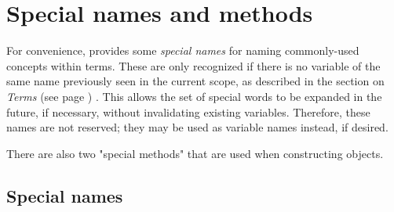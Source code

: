 \chapter{Special names and methods}\label{refspecial}
 
For convenience, \nr{} provides some \emph{special names} for naming
commonly-used concepts within terms.
These are only recognized if there is no variable of the same name
previously seen in the current scope, as described in the section on
 \emph{Terms} (see page \pageref{refterms}) .
This allows the set of special words to be expanded in the future, if
necessary, without invalidating existing variables.  Therefore, these
names are not reserved; they may be used as variable names instead, if
desired.
 
There are also two "special methods" that are used when
constructing objects.
\section{Special names}\label{specialnames}
 
